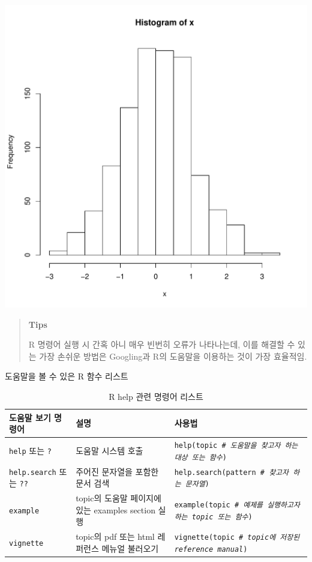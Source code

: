 \documentclass[11pt,a4paper]{book}
\theoremstyle{definition}
\theoremstyle{definition}
\theoremstyle{definition}
\theoremstyle{remark}
\begin{document}
\begin{center}\includegraphics[width=10 cm,height=10 cm]{Figures/check-03-1} \end{center}

\normalsize

\begin{quote}
\colorbox{gray!10}{\begin{minipage}{15cm}
\textbf{Tips}

R 명령어 실행 시 간혹 아니 매우 빈번히 오류가 나타나는데, 이를 해결할 수 있는 가장 손쉬운 방법은 Googling과 R의 도움말을 이용하는 것이 가장 효율적임. 
\end{minipage}}
\end{quote}

도움말을 볼 수 있은 R 함수 리스트

\begin{table}[H]
  \centering
  \begingroup\footnotesize
  \caption{R help 관련 명령어 리스트}
  \begin{tabular}{p{3cm}p{5cm}p{7cm}}
  \toprule
  \textbf{도움말 보기 명령어} & \textbf{설명} & \textbf{사용법} \\
  \midrule
  \texttt{help} 또는 \texttt{?}          & 도움말 시스템 호출               & \texttt{help(topic \textit{\# 도움말을 찾고자 하는 대상 또는 함수}) }\\
  \texttt{help.search} 또는 \texttt{??}  & 주어진 문자열을 포함한 문서 검색 & \texttt{help.search(pattern \textit{\# 찾고자 하는 문자열})} \\ 
  \texttt{example}                       & topic의 도움말 페이지에 있는 examples section 실행 & \texttt{example(topic \textit{\# 예제를 실행하고자 하는 topic 또는 함수})} \\
  \texttt{vignette}                      & topic의 pdf 또는 html 레퍼런스 메뉴얼 불러오기 & \texttt{vignette(topic \textit{\# topic에 저장된 reference manual})} \\
  \bottomrule
  \end{tabular}
  \endgroup
\end{table}
\end{document}
